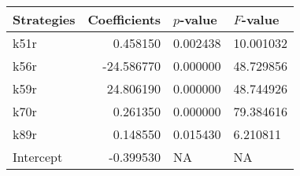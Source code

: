 \begin{tabular}{lrll}
\toprule
Strategies & Coefficients & $p$-value & $F$-value \\
\midrule
k51r & 0.458150 & 0.002438 & 10.001032 \\
k56r & -24.586770 & 0.000000 & 48.729856 \\
k59r & 24.806190 & 0.000000 & 48.744926 \\
k70r & 0.261350 & 0.000000 & 79.384616 \\
k89r & 0.148550 & 0.015430 & 6.210811 \\
Intercept & -0.399530 & NA & NA \\
\bottomrule
\end{tabular}
